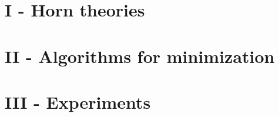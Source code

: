 \documentclass{beamer}
\begin{document}
\section{I - Horn theories}


\section{II - Algorithms for minimization}


\section{III - Experiments}
\end{document}
